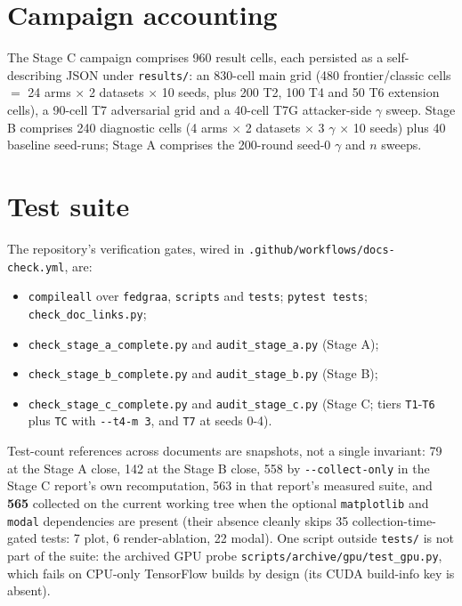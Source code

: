 \documentclass[11pt,a4paper]{report}
\begin{document}
\section{Campaign accounting}
\label{sec:campaign-accounting}

The Stage C campaign comprises 960 result cells, each persisted as a
self-describing JSON under \texttt{results/}: an 830-cell main grid (480
frontier/classic cells $=$ 24 arms $\times$ 2 datasets $\times$ 10 seeds,
plus 200 T2, 100 T4 and 50 T6 extension cells), a 90-cell T7 adversarial
grid and a 40-cell T7G attacker-side $\gamma$ sweep. Stage B comprises 240
diagnostic cells (4 arms $\times$ 2 datasets $\times$ 3 $\gamma$ $\times$ 10
seeds) plus 40 baseline seed-runs; Stage A comprises the 200-round seed-0
$\gamma$ and $n$ sweeps.

\section{Test suite}
\label{sec:test-suite}

The repository's verification gates, wired in
\texttt{.github/workflows/docs-check.yml}, are:
\begin{itemize}[nosep]
  \item \texttt{compileall} over \texttt{fedgraa}, \texttt{scripts} and
  \texttt{tests}; \texttt{pytest tests}; \texttt{check\_doc\_links.py};
  \item \texttt{check\_stage\_a\_complete.py} and
  \texttt{audit\_stage\_a.py} (Stage A);
  \item \texttt{check\_stage\_b\_complete.py} and
  \texttt{audit\_stage\_b.py} (Stage B);
  \item \texttt{check\_stage\_c\_complete.py} and
  \texttt{audit\_stage\_c.py} (Stage C; tiers \texttt{T1}-\texttt{T6} plus
  \texttt{TC} with \texttt{-{}-t4-m 3}, and \texttt{T7} at seeds 0-4).
\end{itemize}

Test-count references across documents are snapshots, not a single
invariant: 79 at the Stage A close, 142 at the Stage B close, 558 by
\texttt{-{}-collect-only} in the Stage C report's own recomputation, 563 in
that report's measured suite, and \textbf{565} collected on the current
working tree when the optional \texttt{matplotlib} and \texttt{modal}
dependencies are present (their absence cleanly skips 35
collection-time-gated tests: 7 plot, 6 render-ablation, 22 modal). One
script outside \texttt{tests/} is not part of the suite: the archived GPU
probe \texttt{scripts/archive/gpu/test\_gpu.py}, which fails on CPU-only
TensorFlow builds by design (its CUDA build-info key is absent).
\end{document}
